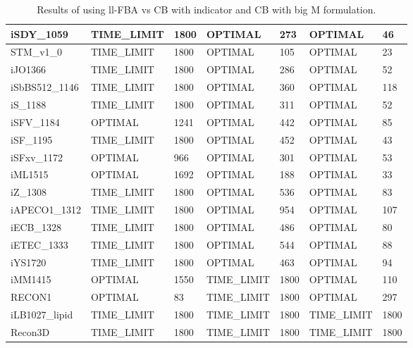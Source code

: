\begin{table}[!ht]
\begin{tabular}{|l|l|l|l|l|l|l|}
        iSDY\_1059 & TIME\_LIMIT & 1800 & OPTIMAL & 273 & OPTIMAL & 46 \\ \hline
        STM\_v1\_0 & TIME\_LIMIT & 1800 & OPTIMAL & 105 & OPTIMAL & 23 \\ \hline
        iJO1366 & TIME\_LIMIT & 1800 & OPTIMAL & 286 & OPTIMAL & 52 \\ \hline
        iSbBS512\_1146 & TIME\_LIMIT & 1800 & OPTIMAL & 360 & OPTIMAL & 118 \\ \hline
        iS\_1188 & TIME\_LIMIT & 1800 & OPTIMAL & 311 & OPTIMAL & 52 \\ \hline
        iSFV\_1184 & OPTIMAL & 1241 & OPTIMAL & 442 & OPTIMAL & 85 \\ \hline
        iSF\_1195 & TIME\_LIMIT & 1800 & OPTIMAL & 452 & OPTIMAL & 43 \\ \hline
        iSFxv\_1172 & OPTIMAL & 966 & OPTIMAL & 301 & OPTIMAL & 53 \\ \hline
        iML1515 & OPTIMAL & 1692 & OPTIMAL & 188 & OPTIMAL & 33 \\ \hline
        iZ\_1308 & TIME\_LIMIT & 1800 & OPTIMAL & 536 & OPTIMAL & 83 \\ \hline
        iAPECO1\_1312 & TIME\_LIMIT & 1800 & OPTIMAL & 954 & OPTIMAL & 107 \\ \hline
        iECB\_1328 & TIME\_LIMIT & 1800 & OPTIMAL & 486 & OPTIMAL & 80 \\ \hline
        iETEC\_1333 & TIME\_LIMIT & 1800 & OPTIMAL & 544 & OPTIMAL & 88 \\ \hline
        iYS1720 & TIME\_LIMIT & 1800 & OPTIMAL & 463 & OPTIMAL & 94 \\ \hline
        iMM1415 & OPTIMAL & 1550 & TIME\_LIMIT & 1800 & OPTIMAL & 110 \\ \hline
        RECON1 & OPTIMAL & 83 & TIME\_LIMIT & 1800 & OPTIMAL & 297 \\ \hline
        iLB1027\_lipid & TIME\_LIMIT & 1800 & TIME\_LIMIT & 1800 & TIME\_LIMIT & 1800 \\ \hline
        Recon3D & TIME\_LIMIT & 1800 & TIME\_LIMIT & 1800 & TIME\_LIMIT & 1800 \\ \hline
    \end{tabular}
    \caption{\label{Tab:cb_vs_llfba} Results of using ll-FBA vs CB with indicator and CB with big M formulation.}
\end{table}

